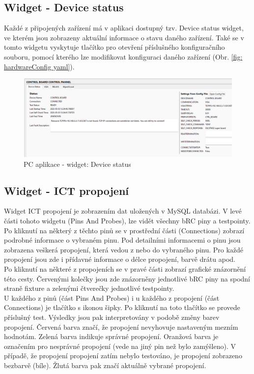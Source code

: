\subsection{Widget - Device status}
Každé z připojených zařízení má v aplikaci dostupný tzv. Device status widget, ve kterém jsou zobrazeny aktuální informace o
stavu daného zařízení. Také se v tomto widgetu vyskytuje tlačítko pro otevření příslušného konfiguračního souboru, pomocí kterého
lze modifikovat konfiguraci daného zařízení (Obr. \ref{fig: hardwareConfig yaml}). 

\begin{figure}[ht!]
    \centering
    \includegraphics[width = 1\textwidth]{obrazky/Device_status.png}
    \caption{PC aplikace - widget:  Device status}
    \label{fig: PCAPP device status}
\end{figure}

\clearpage
\subsection{Widget - ICT propojení}
Widget ICT propojení je zobrazením dat uložených v MySQL databázi. V levé části tohoto widgetu (Pins And Probes), lze vidět všechny
bRC piny a testpointy. Po kliknutí na některý z těchto pinů se v prostřední části (Connections) zobrazí podrobné informace o vybraném pinu.
Pod detailními informacemi o pinu jsou zobrazena veškerá propojení, která vedou z nebo do vybraného pinu. Pro každé propojení jsou zde i přídavné
informace o délce propojení, barvě drátu apod.\\

Po kliknutí na některé z propojeních se v pravé části zobrazí grafické znázornění této cesty. Červenými kolečky jsou zde znázorněny jednotlivé bRC piny
na spodní straně fixture a zelenými čtverečky jednotlivé testpointy.\\

U každého z pinů (část Pins And Probes) i u každého z propojení (část Connections) je tlačítko s ikonou šipky. Po kliknutí na toto tlačítko
se provede příslušný test. Výsledky jsou pak interpretovány v podobě změny barev propojení. Červená barva značí, že propojení nevyhovuje nastaveným mezním hodnotám.
Zelená barva indikuje správné propojení. Oranžová barva je označením pro nesprávné propojení (vede na jiný pin než bylo zamýšleno).
V případě, že propojení propojení zatím nebylo testováno, je propojení zobrazeno bezbarvě (bíle). Žlutá barva pak značí aktuálně vybrané propojení.


